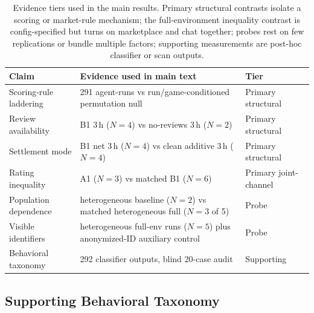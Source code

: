 \documentclass{article}
\begin{document}
\begin{table}[t]
    \centering
    \footnotesize
    \caption{Evidence tiers used in the main results. Primary structural contrasts isolate a scoring or market-rule mechanism; the full-environment inequality contrast is config-specified but turns on marketplace and chat together; probes rest on few replications or bundle multiple factors; supporting measurements are post-hoc classifier or scan outputs.}
    \label{tab:evidence-map}
    \setlength{\tabcolsep}{3pt}
    \begin{tabular}{@{}p{}p{}p{}@{}}
        \toprule
        Claim & Evidence used in main text & Tier \\
        \midrule
        Scoring-rule laddering & 291 agent-runs vs run/game-conditioned permutation null & Primary structural \\
        Review availability & B1 3\,h ($N{=}4$) vs no-reviews 3\,h ($N{=}2$) & Primary structural \\
        Settlement mode & B1 net 3\,h ($N{=}4$) vs clean additive 3\,h ($N{=}4$) & Primary structural \\
        Rating inequality & A1 ($N{=}3$) vs matched B1 ($N{=}6$) & Primary joint-channel \\
        Population dependence & heterogeneous baseline ($N{=}2$) vs matched heterogeneous full ($N{=}3$ of 5) & Probe \\
        Visible identifiers & heterogeneous full-env runs ($N{=}5$) plus anonymized-ID auxiliary control & Probe \\
        Behavioral taxonomy & 292 classifier outputs, blind 20-case audit & Supporting \\
        \bottomrule
    \end{tabular}
\end{table}

\subsection{Supporting Behavioral Taxonomy}
\label{sec:taxonomy}
\end{document}
